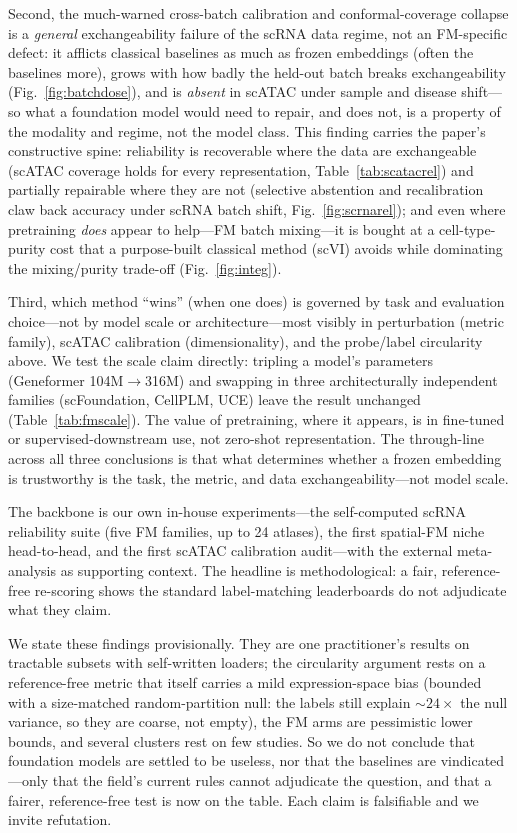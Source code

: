 \documentclass[11pt]{article}
\begin{document}
Second, the much-warned cross-batch calibration and conformal-coverage collapse is a \emph{general} exchangeability failure of the scRNA data regime, not an FM-specific defect: it afflicts classical baselines as much as frozen embeddings (often the baselines more), grows with how badly the held-out batch breaks exchangeability (Fig.~\ref{fig:batchdose}), and is \emph{absent} in scATAC under sample and disease shift---so what a foundation model would need to repair, and does not, is a property of the modality and regime, not the model class. This finding carries the paper's constructive spine: reliability is recoverable where the data are exchangeable (scATAC coverage holds for every representation, Table~\ref{tab:scatacrel}) and partially repairable where they are not (selective abstention and recalibration claw back accuracy under scRNA batch shift, Fig.~\ref{fig:scrnarel}); and even where pretraining \emph{does} appear to help---FM batch mixing---it is bought at a cell-type-purity cost that a purpose-built classical method (scVI) avoids while dominating the mixing/purity trade-off (Fig.~\ref{fig:integ}).

Third, which method ``wins'' (when one does) is governed by task and evaluation choice---not by model scale or architecture---most visibly in perturbation (metric family), scATAC calibration (dimensionality), and the probe/label circularity above. We test the scale claim directly: tripling a model's parameters (Geneformer 104M$\to$316M) and swapping in three architecturally independent families (scFoundation, CellPLM, UCE) leave the result unchanged (Table~\ref{tab:fmscale}). The value of pretraining, where it appears, is in fine-tuned or supervised-downstream use, not zero-shot representation. The through-line across all three conclusions is that what determines whether a frozen embedding is trustworthy is the task, the metric, and data exchangeability---not model scale.

The backbone is our own in-house experiments---the self-computed scRNA reliability suite (five FM families, up to 24 atlases), the first spatial-FM niche head-to-head, and the first scATAC calibration audit---with the external meta-analysis as supporting context. The headline is methodological: a fair, reference-free re-scoring shows the standard label-matching leaderboards do not adjudicate what they claim.

We state these findings provisionally. They are one practitioner's results on tractable subsets with self-written loaders; the circularity argument rests on a reference-free metric that itself carries a mild expression-space bias (bounded with a size-matched random-partition null: the labels still explain ${\sim}24\times$ the null variance, so they are coarse, not empty), the FM arms are pessimistic lower bounds, and several clusters rest on few studies. So we do not conclude that foundation models are settled to be useless, nor that the baselines are vindicated---only that the field's current rules cannot adjudicate the question, and that a fairer, reference-free test is now on the table. Each claim is falsifiable and we invite refutation.
\end{document}
